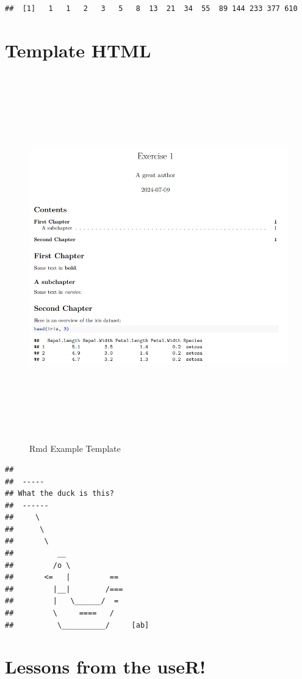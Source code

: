 \documentclass[
]{book}
\begin{document}
\begin{verbatim}
##  [1]   1   1   2   3   5   8  13  21  34  55  89 144 233 377 610
\end{verbatim}

\section{Template HTML}\label{template-html}

\begin{figure}
\centering
\includegraphics[width=\textwidth,height=6.25in]{./img/Rmd-exc1.png}
\caption{Rmd Example Template}
\end{figure}

\begin{verbatim}
## 
##  ----- 
## What the duck is this? 
##  ------ 
##     \   
##      \  
##       \
##          __
##         /o \
##       <=   |         ==
##         |__|        /===
##         |   \______/  =
##         \     ====   /
##          \__________/     [ab]
\end{verbatim}

\section{Lessons from the useR!}\label{lessons-from-the-user}
\end{document}
